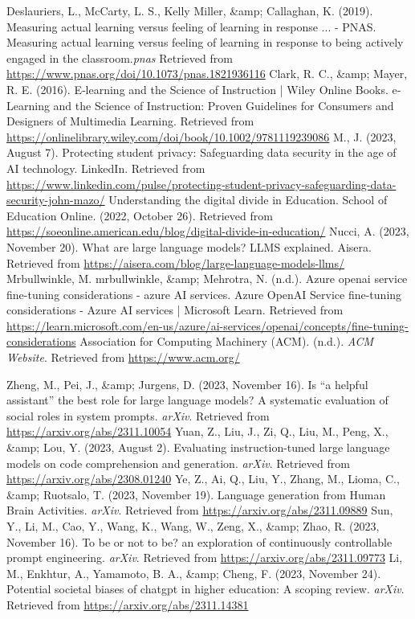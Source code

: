 \documentclass[]{article}
\begin{document}
\begin{thebibliography}{9}
Deslauriers, L., McCarty, L. S., Kelly Miller, \&amp; Callaghan, K. (2019). Measuring actual learning versus feeling of learning in response ... - PNAS. Measuring actual learning versus feeling of learning in response to being actively engaged in the classroom.\textit{pnas} Retrieved from \url{https://www.pnas.org/doi/10.1073/pnas.1821936116}
Clark, R. C., \&amp; Mayer, R. E. (2016). E‐learning and the Science of Instruction | Wiley Online Books.  e‐Learning and the Science of Instruction: Proven Guidelines for Consumers and Designers of Multimedia Learning. Retrieved from \url{https://onlinelibrary.wiley.com/doi/book/10.1002/9781119239086}
M., J. (2023, August 7). Protecting student privacy: Safeguarding data security in the age of AI technology. LinkedIn. Retrieved from \url{https://www.linkedin.com/pulse/protecting-student-privacy-safeguarding-data-security-john-mazo/}
Understanding the digital divide in Education. School of Education Online. (2022, October 26). Retrieved from \url{https://soeonline.american.edu/blog/digital-divide-in-education/}
 Nucci, A. (2023, November 20). What are large language models? LLMS explained. Aisera. Retrieved from \url{https://aisera.com/blog/large-language-models-llms/}
Mrbullwinkle, M. mrbullwinkle, \&amp; Mehrotra, N. (n.d.). Azure openai service fine-tuning considerations - azure AI services. Azure OpenAI Service fine-tuning considerations - Azure AI services | Microsoft Learn. Retrieved from \url{https://learn.microsoft.com/en-us/azure/ai-services/openai/concepts/fine-tuning-considerations}
 Association for Computing Machinery (ACM). (n.d.). \textit{ACM Website}. Retrieved from \url{https://www.acm.org/}

Zheng, M., Pei, J., \&amp; Jurgens, D. (2023, November 16). Is “a helpful assistant” the best role for large language models? A systematic evaluation of social roles in system prompts. \textit{arXiv}. Retrieved from \url{https://arxiv.org/abs/2311.10054}
Yuan, Z., Liu, J., Zi, Q., Liu, M., Peng, X., \&amp; Lou, Y. (2023, August 2). Evaluating instruction-tuned large language models on code comprehension and generation. \textit{arXiv}. Retrieved from \url{https://arxiv.org/abs/2308.01240}
Ye, Z., Ai, Q., Liu, Y., Zhang, M., Lioma, C., \&amp; Ruotsalo, T. (2023, November 19). Language generation from Human Brain Activities. \textit{arXiv}. Retrieved from \url{https://arxiv.org/abs/2311.09889}
Sun, Y., Li, M., Cao, Y., Wang, K., Wang, W., Zeng, X., \&amp; Zhao, R. (2023, November 16). To be or not to be? an exploration of continuously controllable prompt engineering. \textit{arXiv}. Retrieved from \url{https://arxiv.org/abs/2311.09773}
Li, M., Enkhtur, A., Yamamoto, B. A., \&amp; Cheng, F. (2023, November 24). Potential societal biases of chatgpt in higher education: A scoping review. \textit{arXiv}. Retrieved from \url{https://arxiv.org/abs/2311.14381}


\end{thebibliography}
\end{document}
